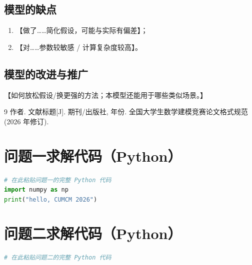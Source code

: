 \documentclass{cumcmthesis}
\begin{document}
\subsection{模型的缺点}
\begin{enumerate}
    \item 【做了……简化假设，可能与实际有偏差】；
    \item 【对……参数较敏感 / 计算复杂度较高】。
\end{enumerate}
\subsection{模型的改进与推广}
【如何放松假设/换更强的方法；本模型还能用于哪些类似场景。】

\begin{thebibliography}{9}
     作者. 文献标题[J]. 期刊/出版社, 年份.
     全国大学生数学建模竞赛论文格式规范(2026 年修订).
\end{thebibliography}

\newpage
\begin{appendices}
\section{问题一求解代码（Python）}
\begin{lstlisting}[language=python]
# 在此粘贴问题一的完整 Python 代码
import numpy as np
print("hello, CUMCM 2026")
\end{lstlisting}

\section{问题二求解代码（Python）}
\begin{lstlisting}[language=python]
# 在此粘贴问题二的完整 Python 代码
\end{lstlisting}
\end{appendices}
\end{document}
